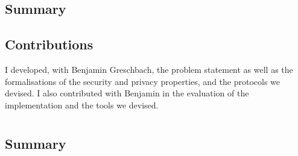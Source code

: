\subsection{Summary}
    \label{subsection:summary-ei}


\subsection{Contributions}
    \label{subsection:contributions-ei}
I developed, with Benjamin Greschbach, the problem statement as well as the formalisations 
of the security and privacy properties, and the protocols we devised. I also contributed 
with Benjamin in the evaluation of the implementation and the tools we devised.


\section{}
\begingroup\centering
\begin{ppBox}
\end{ppBox}
\endgroup

\subsection{Summary}
    \label{subsection:summary-dss}



